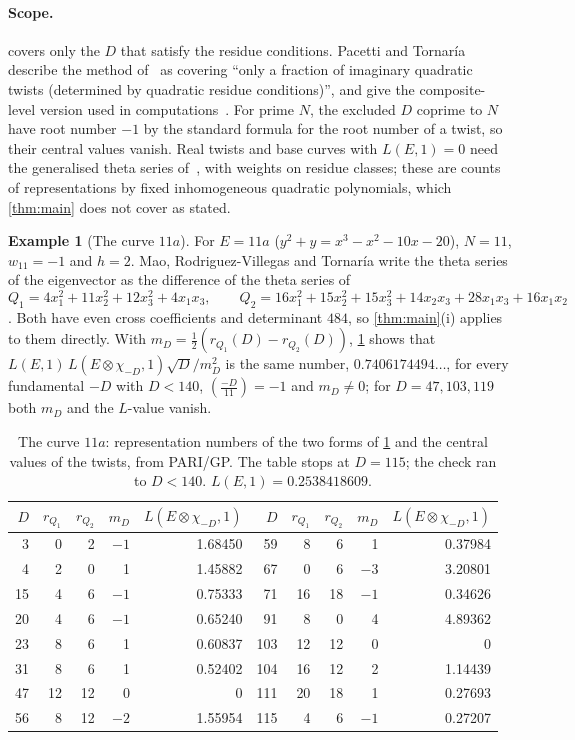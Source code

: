 \documentclass[10pt]{amsart}
\theoremstyle{plain}
\theoremstyle{definition}
\newtheorem{example}[theorem]{Example}
\theoremstyle{remark}
\numberwithin{equation}{section}
\newcommand{\nr}{\dag}%
\begin{document}
\paragraph{Scope.}  covers only the $D$ that satisfy the residue conditions. Pacetti and
Tornar\'ia describe the method of~\cite{BSP90} as covering ``only a fraction of imaginary quadratic twists
(determined by quadratic residue conditions)'', and give the composite-level version used in
computations~\cite{PT08}. For prime $N$, the excluded $D$ coprime to $N$ have root number $-1$ by the
standard formula for the root number of a twist\nr, so their central values vanish. Real twists and base curves with
$L(E,1)=0$ need the generalised theta series of~\cite{MRVT07}, with weights on residue classes; these are
counts of representations by fixed inhomogeneous quadratic polynomials, which \cref{thm:main} does not cover as
stated.

\begin{example}[The curve $11a$]\label{ex:11a}
For $E=11a$ ($y^2+y=x^3-x^2-10x-20$), $N=11$, $w_{11}=-1$ and $h=2$. Mao, Rodriguez-Villegas and Tornar\'ia write
the theta series of the eigenvector as the difference of the theta series of
\[
  Q_1=4x_1^2+11x_2^2+12x_3^2+4x_1x_3,\qquad
  Q_2=16x_1^2+15x_2^2+15x_3^2+14x_2x_3+28x_1x_3+16x_1x_2
\]
\cite[(4.1), (4.2)]{MRVT07}. Both have even cross coefficients and determinant $484$, so
\cref{thm:main}(i) applies to them directly. With $m_D=\frac12(r_{Q_1}(D)-r_{Q_2}(D))$,
\cref{tab:11a} shows that $L(E,1)\,L(E\otimes\chi_{-D},1)\sqrt D/m_D^2$ is the same number,
$0.7406174494\ldots$, for every fundamental $-D$ with $D<140$, $(\frac{-D}{11})=-1$ and $m_D\ne0$; for
$D=47,103,119$ both $m_D$ and the $L$-value vanish.
\end{example}

\begin{table}[ht]
\centering\small
\begin{tabular}{@{}rrrrr@{\qquad}rrrrr@{}}
\toprule
$D$ & $r_{Q_1}$ & $r_{Q_2}$ & $m_D$ & $L(E\otimes\chi_{-D},1)$ & $D$ & $r_{Q_1}$ & $r_{Q_2}$ & $m_D$ & $L(E\otimes\chi_{-D},1)$\\
\midrule
3 & 0 & 2 & $-1$ & 1.68450 & 59 & 8 & 6 & 1 & 0.37984\\
4 & 2 & 0 & 1 & 1.45882 & 67 & 0 & 6 & $-3$ & 3.20801\\
15 & 4 & 6 & $-1$ & 0.75333 & 71 & 16 & 18 & $-1$ & 0.34626\\
20 & 4 & 6 & $-1$ & 0.65240 & 91 & 8 & 0 & 4 & 4.89362\\
23 & 8 & 6 & 1 & 0.60837 & 103 & 12 & 12 & 0 & 0\\
31 & 8 & 6 & 1 & 0.52402 & 104 & 16 & 12 & 2 & 1.14439\\
47 & 12 & 12 & 0 & 0 & 111 & 20 & 18 & 1 & 0.27693\\
56 & 8 & 12 & $-2$ & 1.55954 & 115 & 4 & 6 & $-1$ & 0.27207\\
\bottomrule
\end{tabular}
\caption{The curve $11a$: representation numbers of the two forms of \cref{ex:11a} and the central values
of the twists, from PARI/GP. The table stops at $D=115$; the check ran to $D<140$. $L(E,1)=0.2538418609$.}\label{tab:11a}
\end{table}
\end{document}
